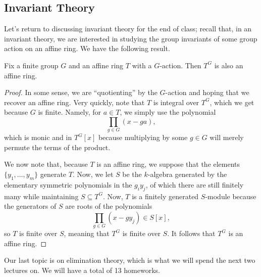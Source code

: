 \documentclass[../notes.tex]{subfiles}
\begin{document}
\subsection{Invariant Theory}
Let's return to discussing invariant theory for the end of class; recall that, in an invariant theory, we are interested in studying the group invariants of some group action on an affine ring. We have the following result.
\begin{theorem}
	Fix a finite group $G$ and an affine ring $T$ with a $G$-action. Then $T^G$ is also an affine ring.
\end{theorem}
\begin{proof}
	In some sense, we are ``quotienting'' by the $G$-action and hoping that we recover an affine ring. Very quickly, note that $T$ is integral over $T^G$, which we get because $G$ is finite. Namely, for $a\in T$, we simply use the polynomial
	\[\prod_{g\in G}(x-ga),\]
	which is monic and in $T^G[x]$ because multiplying by some $g\in G$ will merely permute the terms of the product.

	We now note that, because $T$ is an affine ring, we suppose that the elements $\{y_1,\ldots,y_m\}$ generate $T$. Now, we let $S$ be the $k$-algebra generated by the elementary symmetric polynomials in the $g_iy_j$, of which there are still finitely many while maintaining $S\subseteq T^G$. Now, $T$ is a finitely generated $S$-module because the generators of $S$ are roots of the polynomials
	\[\prod_{g\in G}(x-gy_j)\in S[x],\]
	so $T$ is finite over $S$, meaning that $T^G$ is finite over $S$. It follows that $T^G$ is an affine ring.
\end{proof}
Our last topic is on elimination theory, which is what we will spend the next two lectures on. We will have a total of 13 homeworks.
\end{document}
